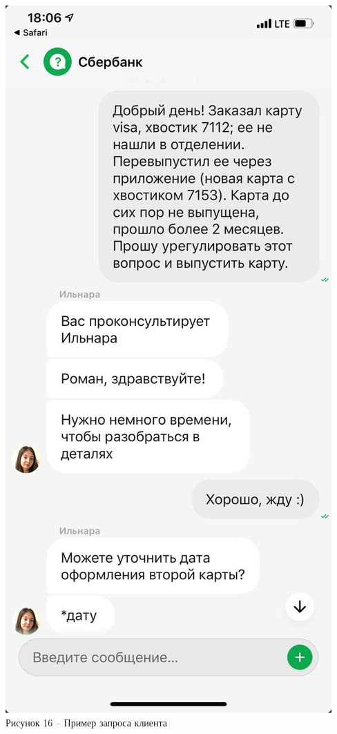 \documentclass[a4paper,12pt,preview]{report} %
\begin{document}
	
	\begin{center}
		\includegraphics[scale=0.3]{input_data.jpg}
		\\ Рисунок 16 -- Пример запроса клиента
	\end{center}
	
\end{document}
